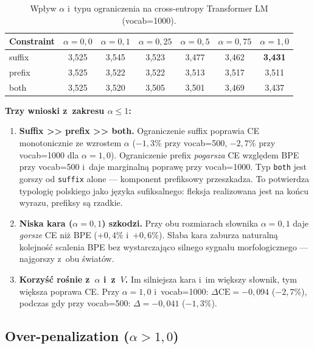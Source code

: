 \begin{table}[h]
  \centering
  \caption{Wpływ $\alpha$ i~typu ograniczenia na cross-entropy
  Transformer LM (vocab=1000).}
  \label{tab:sweep1000}
  \small
  \begin{tabular}{lcccccc}
    \toprule
    Constraint & $\alpha{=}0{,}0$ & $\alpha{=}0{,}1$ & $\alpha{=}0{,}25$ & $\alpha{=}0{,}5$ & $\alpha{=}0{,}75$ & $\alpha{=}1{,}0$ \\
    \midrule
    suffix & 3{,}525 & 3{,}545 & 3{,}523 & 3{,}477 & 3{,}462 & \textbf{3{,}431} \\
    prefix & 3{,}525 & 3{,}522 & 3{,}522 & 3{,}513 & 3{,}517 & 3{,}511 \\
    both   & 3{,}525 & 3{,}520 & 3{,}505 & 3{,}501 & 3{,}469 & 3{,}437 \\
    \bottomrule
  \end{tabular}
\end{table}

\textbf{Trzy wnioski z~zakresu $\alpha \le 1$:}

\begin{enumerate}
  \item \textbf{Suffix >> prefix >> both.} Ograniczenie suffix
        poprawia CE monotonicznie ze wzrostem $\alpha$
        ($-1{,}3\%$ przy vocab=500, $-2{,}7\%$ przy vocab=1000
        dla $\alpha = 1{,}0$). Ograniczenie prefix \emph{pogarsza}
        CE względem BPE przy vocab=500 i~daje marginalną poprawę
        przy vocab=1000. Typ \texttt{both} jest gorszy od
        \texttt{suffix} alone --- komponent prefiksowy przeszkadza.
        To potwierdza typologię polskiego jako języka sufiksalnego:
        fleksja realizowana jest na końcu wyrazu, prefiksy są rzadkie.
  \item \textbf{Niska kara ($\alpha = 0{,}1$) szkodzi.} Przy obu
        rozmiarach słownika $\alpha = 0{,}1$ daje \emph{gorsze} CE
        niż BPE ($+0{,}4\%$ i~$+0{,}6\%$). Słaba kara zaburza
        naturalną kolejność scalenia BPE bez wystarczająco silnego
        sygnału morfologicznego --- najgorszy z~obu światów.
  \item \textbf{Korzyść rośnie z~$\alpha$ i~z~$V$.} Im silniejsza
        kara i~im większy słownik, tym większa poprawa CE.
        Przy $\alpha = 1{,}0$ i~vocab=1000: $\Delta\mathrm{CE} = -0{,}094$
        ($-2{,}7\%$), podczas gdy przy vocab=500: $\Delta = -0{,}041$
        ($-1{,}3\%$).
\end{enumerate}

\subsection*{Over-penalization ($\alpha > 1{,}0$)}


